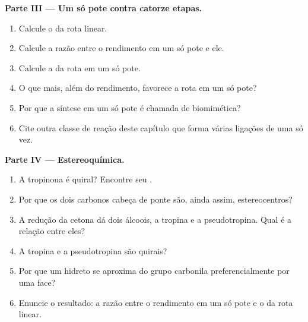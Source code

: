 \begin{problem}
\medskip\noindent\textbf{Parte III --- Um só pote contra catorze etapas.}
\begin{enumerate}[resume]
  \item Calcule o  da rota linear.
  \item Calcule a razão entre o rendimento em um só pote e ele.
  \item Calcule a  da rota em um só pote.
  \item O que mais, além do rendimento, favorece a rota em um só pote?
  \item Por que a síntese em um só pote é chamada de biomimética?
  \item Cite outra classe de reação deste capítulo que forma várias ligações de uma só vez.
\end{enumerate}

\medskip\noindent\textbf{Parte IV --- Estereoquímica.}
\begin{enumerate}[resume]
  \item A tropinona é quiral? Encontre seu .
  \item Por que os dois carbonos cabeça de ponte são, ainda assim, estereocentros?
  \item A redução da cetona dá dois álcoois, a tropina e a pseudotropina. Qual é
        a relação entre eles?
  \item A tropina e a pseudotropina são quirais?
  \item Por que um hidreto se aproxima do grupo carbonila preferencialmente por uma face?
  \item Enuncie o resultado: a razão entre o rendimento em um só pote e o 
        da rota linear.
\end{enumerate}
\end{problem}
